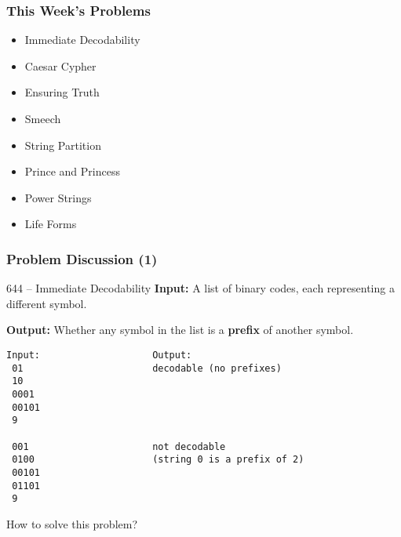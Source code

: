 \begin{frame}
  \frametitle{This Week's Problems}

  \begin{itemize}
  \item Immediate Decodability
  \item Caesar Cypher
  \item Ensuring Truth
  \item Smeech
  \item String Partition
  \item Prince and Princess
  \item Power Strings
  \item Life Forms
  \end{itemize}

\end{frame}

\begin{frame}[fragile]
  \frametitle{Problem Discussion (1)}
  {\smaller
    \begin{block}{644 -- Immediate Decodability}
      {\bf Input:} A list of binary codes, each representing
      a different symbol.

      \bigskip
      
      {\bf Output:} Whether any symbol in the list is a
      {\bf prefix} of another symbol.
    \end{block}

\begin{verbatim}
Input:                    Output:
 01                       decodable (no prefixes)
 10
 0001
 00101
 9

 001                      not decodable
 0100                     (string 0 is a prefix of 2)
 00101
 01101
 9
\end{verbatim}

\vfill

How to solve this problem?
  }
\end{frame}

